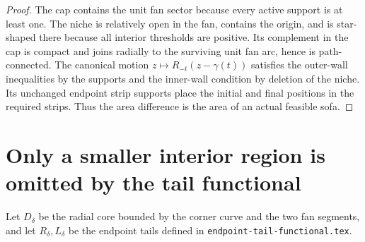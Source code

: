 \documentclass[11pt]{article}
\begin{document}
\begin{proof}
The cap contains the unit fan sector because every active support is at least one. The niche is relatively open in the fan, contains the origin, and is star-shaped there because all interior thresholds are positive. Its complement in the cap is compact and joins radially to the surviving unit fan arc, hence is path-connected. The canonical motion $z\mapsto R_{-t}(z-\gamma(t))$ satisfies the outer-wall inequalities by the supports and the inner-wall condition by deletion of the niche. Its unchanged endpoint strip supports place the initial and final positions in the required strips. Thus the area difference is the area of an actual feasible sofa.
\end{proof}

\section*{Only a smaller interior region is omitted by the tail functional}
Let $D_\delta$ be the radial core bounded by the corner curve and the two fan segments, and let $R_\delta,L_\delta$ be the endpoint tails defined in \texttt{endpoint-tail-functional.tex}.
\end{document}

